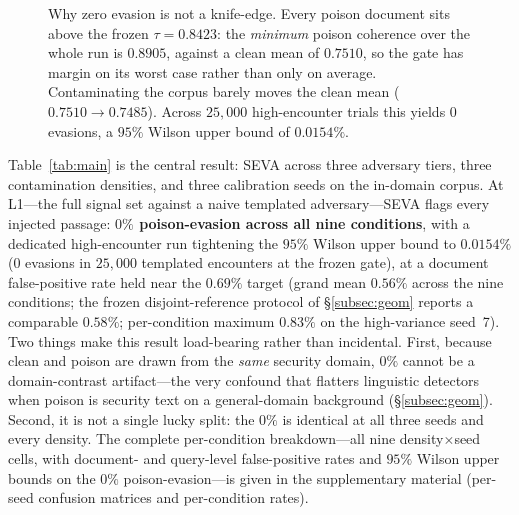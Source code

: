 \documentclass[10pt,journal,compsoc]{IEEEtran}
\begin{document}
\begin{figure}[t]
\centering
{}
\caption{Why zero evasion is not a knife-edge. Every poison document sits above the
frozen $\tau=0.8423$: the \emph{minimum} poison coherence over the whole run is $0.8905$, against
a clean mean of $0.7510$, so the gate has margin on its worst case rather than only on average.
Contaminating the corpus barely moves the clean mean ($0.7510\to0.7485$). Across $25{,}000$
high-encounter trials this yields $0$ evasions, a $95\%$ Wilson upper bound of $0.0154\%$.}
\label{fig:ci}
\end{figure}
Table~\ref{tab:main} is the central result: SEVA across three adversary tiers,
three contamination densities, and three calibration seeds on the in-domain
corpus. At L1---the full signal set against a naive templated adversary---SEVA
flags every injected passage: \textbf{$0\%$ poison-evasion across all nine
conditions}, with a dedicated high-encounter run tightening the $95\%$ Wilson upper
bound to $0.0154\%$ ($0$ evasions in $25{,}000$ templated encounters at the frozen
gate), at a document false-positive rate held near the $0.69\%$ target (grand mean
$0.56\%$ across the nine conditions; the frozen disjoint-reference protocol of
\S\ref{subsec:geom} reports a comparable $0.58\%$; per-condition maximum $0.83\%$ on the
high-variance seed~7).
Two things make this result load-bearing rather than incidental. First, because
clean and poison are drawn from the \emph{same} security domain, $0\%$ cannot be a
domain-contrast artifact---the very confound that flatters linguistic detectors
when poison is security text on a general-domain background (\S\ref{subsec:geom}).
Second, it is not a single lucky split: the $0\%$ is identical at all three seeds
and every density. The complete per-condition breakdown---all nine
density$\times$seed cells, with document- and query-level false-positive rates and
$95\%$ Wilson upper bounds on the $0\%$ poison-evasion---is given in the
supplementary material (per-seed confusion matrices and per-condition rates).
\end{document}
